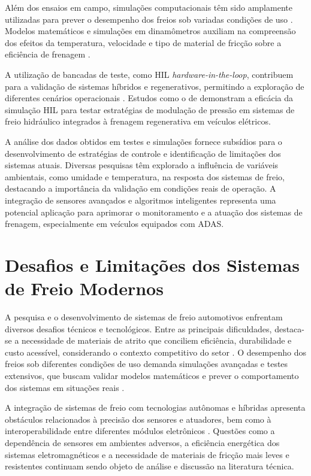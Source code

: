 Além dos ensaios em campo, simulações computacionais têm sido amplamente utilizadas para prever o desempenho dos freios sob variadas condições de uso \cite{Lentin2022}. Modelos matemáticos e simulações em dinamômetros auxiliam na compreensão dos efeitos da temperatura, velocidade e tipo de material de fricção sobre a eficiência de frenagem \cite{AndrewJ2022}.

A utilização de bancadas de teste, como HIL \textit{hardware-in-the-loop}, contribuem para a validação de sistemas híbridos e regenerativos, permitindo a exploração de diferentes cenários operacionais \cite{Donghai2022}. Estudos como o de \cite{Lv2014} demonstram a eficácia da simulação HIL para testar estratégias de modulação de pressão em sistemas de freio hidráulico integrados à frenagem regenerativa em veículos elétricos.

A análise dos dados obtidos em testes e simulações fornece subsídios para o desenvolvimento de estratégias de controle e identificação de limitações dos sistemas atuais. Diversas pesquisas têm explorado a influência de variáveis ambientais, como umidade e temperatura, na resposta dos sistemas de freio, destacando a importância da validação em condições reais de operação. A integração de sensores avançados e algoritmos inteligentes representa uma potencial aplicação para aprimorar o monitoramento e a atuação dos sistemas de frenagem, especialmente em veículos equipados com ADAS\cite{KapinskiJamesDeshmukh2016}.

\section{Desafios e Limitações dos Sistemas de Freio Modernos}
\label{sec:o-estado-da-arte-5-2}
A pesquisa e o desenvolvimento de sistemas de freio automotivos enfrentam diversos desafios técnicos e tecnológicos. Entre as principais dificuldades, destaca-se a necessidade de materiais de atrito que conciliem eficiência, durabilidade e custo acessível, considerando o contexto competitivo do setor \cite{AndrewJ2022}. O desempenho dos freios sob diferentes condições de uso demanda simulações avançadas e testes extensivos, que buscam validar modelos matemáticos e prever o comportamento dos sistemas em situações reais \cite{Lentin2022}.

A integração de sistemas de freio com tecnologias autônomas e híbridas apresenta obstáculos relacionados à precisão dos sensores e atuadores, bem como à interoperabilidade entre diferentes módulos eletrônicos \cite{Donghai2022, Lentin2022}. Questões como a dependência de sensores em ambientes adversos, a eficiência energética dos sistemas eletromagnéticos e a necessidade de materiais de fricção mais leves e resistentes continuam sendo objeto de análise e discussão na literatura técnica.

